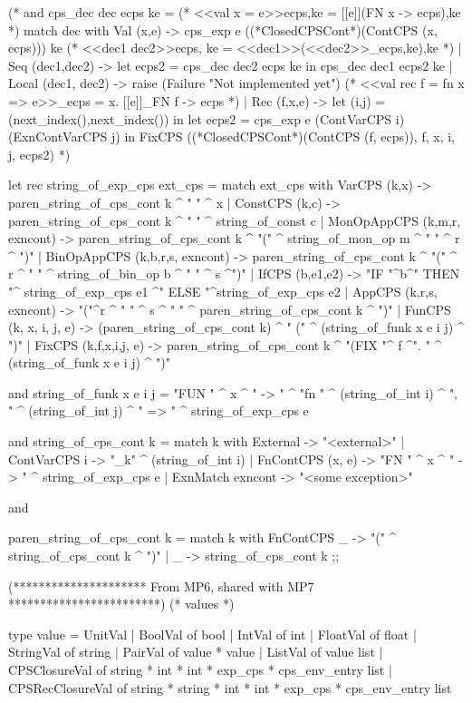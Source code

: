 (*
and
   cps_dec dec ecps ke =
(*   <<val x = e>>ecps,ke = [[e]](FN x -> ecps),ke *)
   match dec with Val (x,e) -> cps_exp e ((*ClosedCPSCont*)(ContCPS (x, ecps))) ke
(*   <<dec1 dec2>>ecps, ke = <<dec1>>(<<dec2>>_ecps,ke),ke *)
   | Seq (dec1,dec2) -> let ecps2 =
     cps_dec dec2 ecps ke in cps_dec dec1 ecps2 ke
   | Local (dec1, dec2) ->  raise (Failure "Not implemented yet")
(*   <<val rec f = fn x => e>>_ecps = \mu x. [[e]]_FN f -> ecps *)
   | Rec (f,x,e) ->
     let (i,j) = (next_index(),next_index()) in
     let ecps2 = cps_exp e (ContVarCPS i) (ExnContVarCPS j) in
     FixCPS ((*ClosedCPSCont*)(ContCPS (f, ecps)), f, x, i, j, ecps2)
*)


let rec string_of_exp_cps ext_cps = 
    match ext_cps 
    with VarCPS (k,x) -> 
        paren_string_of_cps_cont k ^ " " ^ x 
    | ConstCPS (k,c) -> 
        paren_string_of_cps_cont k ^ " " ^ string_of_const c 
    | MonOpAppCPS (k,m,r, exncont) -> 
        paren_string_of_cps_cont k ^ "(" ^  string_of_mon_op m ^ " " ^ r ^ ")" 
    | BinOpAppCPS (k,b,r,s, exncont) -> 
        paren_string_of_cps_cont k ^ "(" ^ r ^ " " ^ string_of_bin_op b ^ " " ^ s ^")" 
    | IfCPS (b,e1,e2) -> 
        "IF "^b^" THEN "^ string_of_exp_cps e1 ^" ELSE "^string_of_exp_cps e2 
    | AppCPS (k,r,s, exncont) -> 
        "("^r ^ " " ^ s ^ " " ^ paren_string_of_cps_cont k ^ ")"  
    | FunCPS (k, x, i, j, e) ->  
        (paren_string_of_cps_cont k) ^ " (" ^ (string_of_funk x e i j) ^ ")" 
    | FixCPS (k,f,x,i,j, e) -> 
        paren_string_of_cps_cont k ^ "(FIX "^ f ^". " ^ (string_of_funk x e i j) ^ ")" 

and string_of_funk x e i j = 
    "FUN " ^ x  ^ " -> " ^ "fn " ^ (string_of_int i) ^ ", " ^ (string_of_int j) ^ " => " ^ string_of_exp_cps e 

and 
string_of_cps_cont k = 
    match k 
    with External -> "<external>" 
    | ContVarCPS i -> "_k" ^ (string_of_int i) 
    | FnContCPS (x, e) -> "FN " ^ x ^ " -> " ^ string_of_exp_cps e 
    | ExnMatch exncont -> "<some exception>" 

and 

paren_string_of_cps_cont k = 
    match k with FnContCPS _ -> "(" ^ string_of_cps_cont k ^ ")" 
    | _ -> string_of_cps_cont k ;;





(********************* From MP6, shared with MP7 ************************)
(*                  values                   *)

	
type value =
    UnitVal                             
  | BoolVal of bool
  | IntVal of int                       
  | FloatVal of float
  | StringVal of string                 
  | PairVal of value * value
  | ListVal of value list 
  | CPSClosureVal of string * int * int * exp_cps * cps_env_entry list
  | CPSRecClosureVal of string * string * int * int * exp_cps * cps_env_entry list

